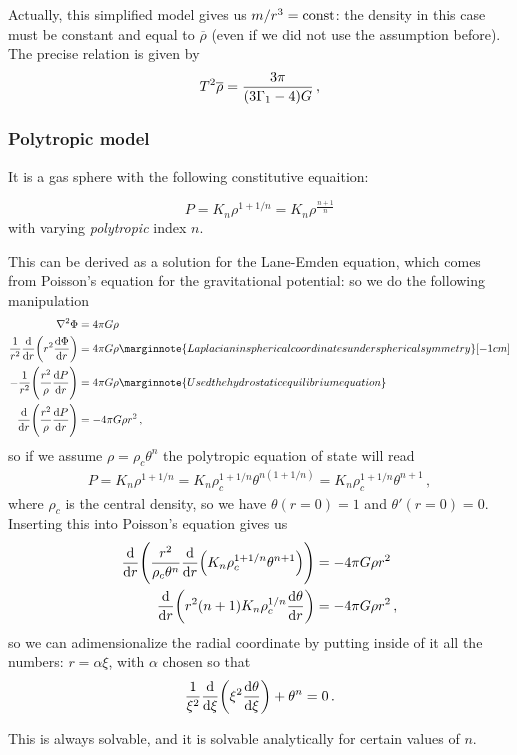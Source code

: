 \documentclass[main.tex]{subfiles}
\begin{document}
Actually, this simplified model gives us \(m / r^3 = \text{const}\): the density in this case must be constant and equal to \(\overline{\rho}\) (even if we did not use the assumption before). 
The precise relation is given by 
%
\begin{align}
T^2 \overline{\rho} = \frac{3 \pi }{\qty(3 \Gamma_1 -4) G}
\,,
\end{align}
%


\subsubsection{Polytropic model}

It is a gas sphere with the following constitutive equaition:

\begin{equation}
  P = K_n \rho^{1 + 1/n} = K_n \rho^{\frac{n+1}{n}}
\end{equation}
%
with varying \emph{polytropic} index \(n\).

\begin{bluebox}
This can be derived as a solution for the Lane-Emden equation, which comes from Poisson's equation for the gravitational potential: so we do the following manipulation 
%
\begin{align}
\nabla^2 \Phi  &= 4 \pi G \rho  \\
\frac{1}{r^2} \dv{}{r} \qty(r^2 \dv{\Phi }{r}) &= 4 \pi G \rho  \marginnote{Laplacian in spherical coordinates under spherical symmetry}[-1cm]\\
-\frac{1}{r^2}\qty(\frac{r^2}{\rho } \dv{P}{r}) &= 4 \pi G \rho   \marginnote{Used the hydrostatic equilibrium equation}\\
\dv{}{r} \qty(\frac{r^2}{\rho } \dv{P}{r}) &= - 4 \pi G \rho r^2
\,,
\end{align}
%
so if we assume \(\rho = \rho_{c} \theta^{n}\) the polytropic equation of state will read 
%
\begin{align}
P = K_n \rho^{1 + 1/n} = K_n \rho_{c}^{1 + 1/n} \theta^{n (1 + 1/n)}
= K_n \rho_{c}^{1 + 1/n} \theta^{n+1}
\,,
\end{align}
%
where \(\rho_{c}\) is the central density, so we have \(\theta (r=0) = 1\) and \(\theta' (r=0) =0\). Inserting this into Poisson's equation gives us 
%
\begin{align}
\dv{}{r} \qty(\frac{r^2}{\rho_{c} \theta^{n}}
\dv{}{r} \qty(K_{n} \rho_{c}^{1 + 1/n} \theta^{n+1})) &=-4 \pi G \rho r^2  \\
\dv{}{r} \qty(r^2 (n+1) K_n \rho_{c}^{1/n} \dv{\theta }{r}) & = - 4 \pi G \rho r^2
\,,
\end{align}
%
so we can adimensionalize the radial coordinate by putting inside of it all the numbers: \(r = \alpha \xi \), with \(\alpha \) chosen so that 
%
\begin{align}
\frac{1}{\xi^2} \dv{}{\xi } \qty(\xi^2 \dv{\theta }{\xi })
+ \theta^{n} = 0
\,.
\end{align}

This is always solvable, and it is solvable analytically for certain values of \(n\). 

\end{bluebox}
\end{document}
